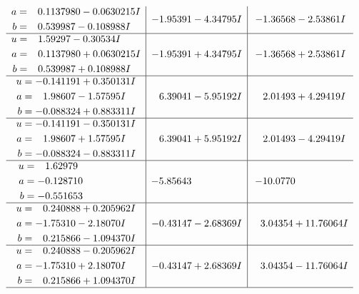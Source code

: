 \documentclass[1p]{elsarticle_modified}
\theoremstyle{definition}
\begin{document}
$$\begin{array}{c|c|c}
\begin{aligned}
a &= \phantom{-}0.1137980 - 0.0630215 I \\
b &= \phantom{-}0.539987 - 0.108988 I\end{aligned}
 & -1.95391 - 4.34795 I & -1.36568 - 2.53861 I \\ \hline\begin{aligned}
u &= \phantom{-}1.59297 - 0.30534 I \\
a &= \phantom{-}0.1137980 + 0.0630215 I \\
b &= \phantom{-}0.539987 + 0.108988 I\end{aligned}
 & -1.95391 + 4.34795 I & -1.36568 + 2.53861 I \\ \hline\begin{aligned}
u &= -0.141191 + 0.350131 I \\
a &= \phantom{-}1.98607 - 1.57595 I \\
b &= -0.088324 + 0.883311 I\end{aligned}
 & \phantom{-}6.39041 - 5.95192 I & \phantom{-}2.01493 + 4.29419 I \\ \hline\begin{aligned}
u &= -0.141191 - 0.350131 I \\
a &= \phantom{-}1.98607 + 1.57595 I \\
b &= -0.088324 - 0.883311 I\end{aligned}
 & \phantom{-}6.39041 + 5.95192 I & \phantom{-}2.01493 - 4.29419 I \\ \hline\begin{aligned}
u &= \phantom{-}1.62979\phantom{ +0.000000I} \\
a &= -0.128710\phantom{ +0.000000I} \\
b &= -0.551653\phantom{ +0.000000I}\end{aligned}
 & -5.85643\phantom{ +0.000000I} & -10.0770\phantom{ +0.000000I} \\ \hline\begin{aligned}
u &= \phantom{-}0.240888 + 0.205962 I \\
a &= -1.75310 - 2.18070 I \\
b &= \phantom{-}0.215866 - 1.094370 I\end{aligned}
 & -0.43147 - 2.68369 I & \phantom{-}3.04354 + 11.76064 I \\ \hline\begin{aligned}
u &= \phantom{-}0.240888 - 0.205962 I \\
a &= -1.75310 + 2.18070 I \\
b &= \phantom{-}0.215866 + 1.094370 I\end{aligned}
 & -0.43147 + 2.68369 I & \phantom{-}3.04354 - 11.76064 I\\
 \hline 
 \end{array}$$\newpage\newpage\renewcommand{\arraystretch}{1}
\end{document}
